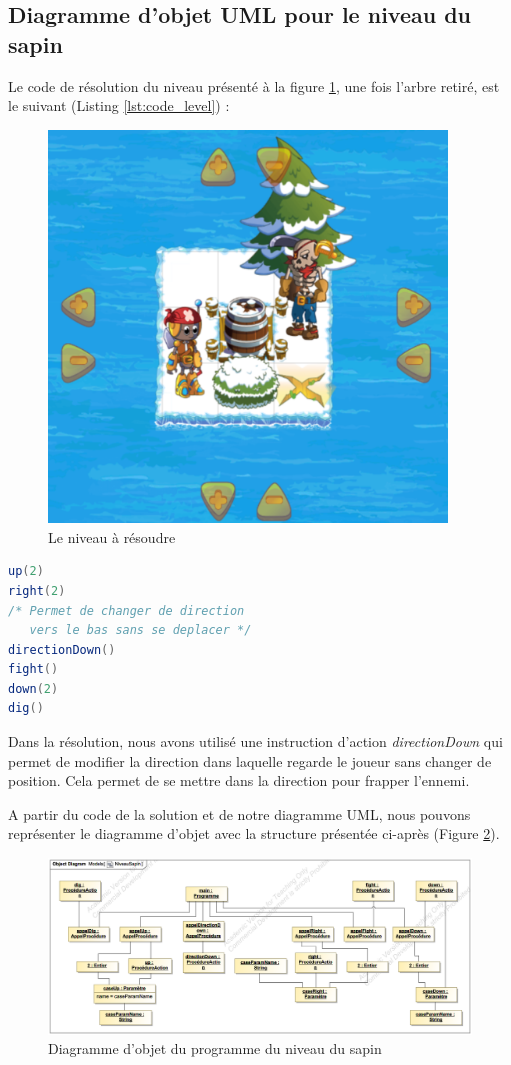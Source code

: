 
\subsection{Diagramme d'objet UML pour le \guillemotleft niveau du sapin\guillemotright}
\label{sec:question15}

Le code de résolution du niveau présenté à la figure \ref{fig:level}, une fois l'arbre retiré, est  le suivant (Listing \ref{lst:code_level}) :

\begin{figure}
	\centering
	\includegraphics[width=300pt]{assets/level}
	\caption{Le niveau à résoudre}
	\label{fig:level}
\end{figure}

\begin{lstlisting}[caption=Le code permettant de résoudre le niveau,captionpos=b,label={lst:code_level},language=Java]
up(2)
right(2)
/* Permet de changer de direction 
   vers le bas sans se deplacer */
directionDown() 
fight()
down(2)
dig()
\end{lstlisting}

Dans la résolution, nous avons utilisé une instruction d'action \emph{directionDown} qui permet de modifier la direction dans laquelle regarde le joueur sans changer de position. Cela permet de se mettre dans la direction pour frapper l'ennemi.

A partir du code de la solution et de notre diagramme UML, nous pouvons représenter le diagramme d'objet avec la structure présentée ci-après (Figure \ref{fig:diag_obj_1}).

\begin{figure}[h!]
	\centering
	\includegraphics[width=500pt]{assets/obj__NiveauSapin}
	\caption{Diagramme d'objet du programme du niveau du sapin}
	\label{fig:diag_obj_1}
\end{figure}
